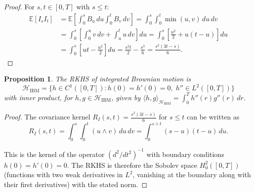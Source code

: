 \documentclass[12pt]{article}
\theoremstyle{plain}
\newtheorem{proposition}[theorem]{Proposition}
\theoremstyle{definition}
\theoremstyle{remark}
\newcommand{\E}{\mathbb{E}}
\newcommand{\HH}{\mathcal{H}}
\begin{document}
\begin{proof}
For $s, t \in [0,T]$ with $s \leq t$:
\begin{align}
\E[I_s I_t] &= \E\left[\int_0^s B_u \, du \int_0^t B_v \, dv\right] = \int_0^s \int_0^t \min(u,v) \, du \, dv \label{eq:IBM-cov-1} \\
&= \int_0^s \left[\int_0^u v \, dv + \int_u^t u \, dv\right] du = \int_0^s \left[\frac{u^2}{2} + u(t-u)\right] du \label{eq:IBM-cov-2} \\
&= \int_0^s \left[ut - \frac{u^2}{2}\right] du = \frac{s^2 t}{2} - \frac{s^3}{6} = \frac{s^2(3t-s)}{6}. \label{eq:IBM-cov-3}
\end{align}
\end{proof}

\begin{proposition}\label{prop:IBM-RKHS}
The RKHS of integrated Brownian motion is
\begin{equation}\label{eq:IBM-RKHS}
\HH_{\mathrm{IBM}} = \bigl\{h \in C^1([0,T]) : h(0) = h'(0) = 0, \; h'' \in L^2([0,T])\bigr\}
\end{equation}
with inner product, for $h, g \in \HH_{\mathrm{IBM}}$, given by $\langle h, g \rangle_{\HH_{\mathrm{IBM}}} = \int_0^T h''(r) g''(r) \, dr$.
\end{proposition}

\begin{proof}
The covariance kernel $R_I(s,t) = \frac{s^2(3t-s)}{6}$ for $s \leq t$ can be written as
\begin{equation}\label{eq:IBM-kernel-rep}
R_I(s,t) = \int_0^s \int_0^t (u \wedge v) \, du \, dv = \int_0^{s \wedge t} (s-u)(t-u) \, du.
\end{equation}

This is the kernel of the operator $(d^2/dt^2)^{-1}$ with boundary conditions $h(0) = h'(0) = 0$. The RKHS is therefore the Sobolev space $H_0^2([0,T])$ (functions with two weak derivatives in $L^2$, vanishing at the boundary along with their first derivatives) with the stated norm.
\end{proof}
\end{document}
